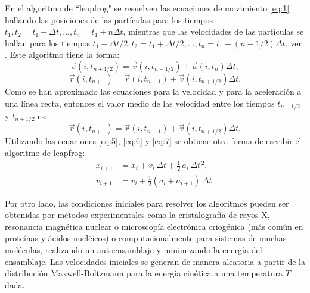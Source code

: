En el algoritmo de ``leapfrog" se resuelven las ecuaciones de movimiento \eqref{eq:1} hallando las posiciones de las part\'{i}culas para los tiempos $t_1,t_2=t_1+\Delta t,...,t_n=t_{1}+n\Delta t$, mientras que las velocidades de las part\'{i}culas se hallan para los tiempos $t_1-\Delta t/2,t_2=t_1+\Delta t/2,...,t_n=t_{1}+(n-1/2)\Delta t$, ver \cite{Mazur1997CommonRevisited}.  Este algoritmo tiene la forma:
\begin{equation}\label{eq:5}
\vec{v}{(i,t_{n+1/2})}=\vec{v}{(i,t_{n-1/2})}+\vec{a}{(i,t_{n})}\Delta t,
\end{equation}
\begin{equation}\label{eq:6}
\vec{r}{(i,t_{n+1})}=\vec{r}{(i,t_{n-1})}+\vec{v}{(i,t_{n+1/2})}\Delta t.
\end{equation}
Como se han aproximado las ecuaciones para la velocidad y para la aceleraci\'{o}n a una l\'{i}nea recta, entonces el valor medio de las velocidad entre los tiempos $t_{n-1/2}$ y $t_{n+1/2}$ es:
\begin{equation}\label{eq:7}
\vec{r}{(i,t_{n+1})}=\vec{r}{(i,t_{n-1})}+\vec{v}{(i,t_{n+1/2})}\Delta t.
\end{equation}
Utilizando las ecuaciones \eqref{eq:5}, \eqref{eq:6} y \eqref{eq:7} se obtiene otra forma de escribir el algoritmo de leapfrog:
\begin{eqnarray}
  x_{i+1} &= x_i + v_i\, \Delta t + \tfrac{1}{2}\,a_i\, \Delta t^{\,2}, \\
  v_{i+1} &= v_i + \tfrac{1}{2}(a_i + a_{i+1})\,\Delta t.
\end{eqnarray}

Por otro lado, las condiciones iniciales para resolver los algoritmos pueden ser obtenidas por m\'{e}todos experimentales como la cristalograf\'{i}a de rayos-X, resonancia magn\'{e}tica nuclear o microscop\'{i}a electr\'{o}nica criog\'{e}nica (m\'{a}s com\'{u}n en prote\'{i}nas y \'{a}cidos nucl\'{e}icos) o computacionalmente para sistemas de muchas mol\'{e}culas, realizando un autoensamblaje y minimizando la energ\'{i}a del ensamblaje. Las velocidades iniciales se generan de manera aleatoria a partir de la distribuci\'{o}n Maxwell-Boltzmann para la energ\'{i}a cin\'{e}tica a una temperatura $T$ dada.\\
